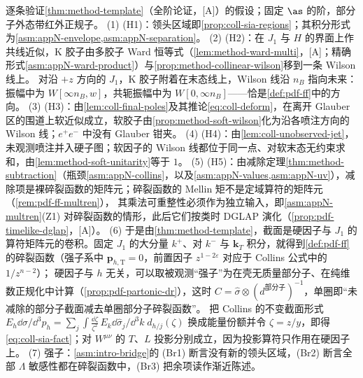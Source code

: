 \begin{proofsketch}
逐条验证\cref{thm:method-template}（全阶论证，[A]）的假设；固定 $\as$ 的阶，部分子外态带红外正规子。
(1) (H1)：领头区域即\cref{prop:coll-sia-regions}；其积分形式为\cref{asm:appN-envelope,asm:appN-separation}。
(2) (H2)：在 $J_1$ 与 $H$ 的界面上作共线近似，K 胶子由多胶子 Ward 恒等式（\cref{lem:method-ward-multi}，[A]；精确形式\cref{asm:appN-ward-product}）与\cref{prop:method-collinear-wilson}移到一条 Wilson 线上。
对沿 $+z$ 方向的 $J_1$，K 胶子附着在末态线上，Wilson 线沿 $n_B$ 指向未来：振幅中为 $W[\infty n_B,w]$，共轭振幅中为 $W[0,\infty n_B]$——恰是\cref{def:pdf-ff}中的方向。
(3) (H3)：由\cref{lem:coll-final-poles}及其推论\cref{eq:coll-deform}，在离开 Glauber 区的围道上软近似成立，软胶子由\cref{prop:method-soft-wilson}化为沿各喷注方向的 Wilson 线；$e^+e^-$ 中没有 Glauber 钳夹。
(4) (H4)：由\cref{lem:coll-unobserved-jet}，未观测喷注并入硬子图；软因子的 Wilson 线都位于同一点、对软末态无约束求和，由\cref{lem:method-soft-unitarity}等于 $1$。
(5) (H5)：由减除定理\cref{thm:method-subtraction}（瓶颈\cref{asm:appN-collins}，以及\cref{asm:appN-values,asm:appN-uv}），减除项是裸碎裂函数的矩阵元；碎裂函数的 Mellin 矩不是定域算符的矩阵元（\cref{rem:pdf-ff-multren}），
其乘法可重整性必须作为独立输入，即\cref{asm:appN-multren}(Z1) 对碎裂函数的情形，此后它们按类时 DGLAP 演化（\cref{prop:pdf-timelike-dglap}，[A]）。
(6) 于是由\cref{thm:method-template}，截面是硬因子与 $J_1$ 的算符矩阵元的卷积。固定 $J_1$ 的大分量 $k^+$、对 $k^-$ 与 $\mathbf k_T$ 积分，就得到\cref{def:pdf-ff}的碎裂函数（强子系中 $\bm p_{h,\mathrm T}=0$，前置因子 $z^{1-2\varepsilon}$ 对应于 Collins 公式中的 $1/z^{n-2}$\cite[式~(12.13)]{Collins2011}）；
硬因子与 $h$ 无关，可以取被观测“强子”为在壳无质量部分子、在纯维数正规化中计算（\cref{prop:pdf-partonic-dr}），这时 $C=\hat\sigma\otimes(d^{\text{部分子}})^{-1}$，单圈即“未减除的部分子截面减去单圈部分子碎裂函数”\cite[式~(12.82)]{Collins2011}。
把 Collins 的不变截面形式 $E_h\dd\sigma/\dd^3p_h=\sum_j\int\frac{\dd\zeta}{\zeta^2}\,E_k\dd\hat\sigma_j/\dd^3k\;d_{h/j}(\zeta)$ 换成能量份额并令 $\zeta=z/y$，即得\cref{eq:coll-sia-fact}；对 $W^{\mu\nu}$ 的 $T$、$L$ 投影分别成立，因为投影算符只作用在硬因子上。
(7) 强子：\cref{asm:intro-bridge}的 (Br1) 断言没有新的领头区域，(Br2) 断言全部 $\Lambda$ 敏感性都在碎裂函数中，(Br3) 把余项读作渐近陈述。
\end{proofsketch}

